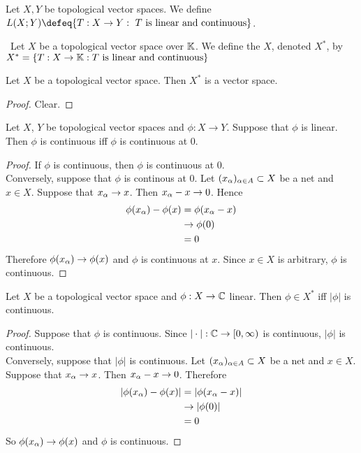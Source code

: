 \documentclass{book}
\begin{document}
	\begin{defn}
		Let $X,Y$ be topological vector spaces. We define $L(X;Y) \defeq \{T:X \rightarrow Y: \text{ $T$ is linear and continuous}\}$.
	\end{defn}
	
	\begin{defn} \
		Let $X$ be a topological vector space over $\mathbb{K}$. We define the  $X$, denoted $X^*$, by $X^* = \{ T : X \rightarrow \mathbb{K}: T \text{ is linear and continuous} \} $
	\end{defn}
	

	\begin{ex}
		Let $X$ be a topological vector space. Then $X^*$ is a vector space. 
	\end{ex}

	\begin{proof}
		Clear.
	\end{proof}

	\begin{ex}
		Let $X$, $Y$ be topological vector spaces and $\phi:X \rightarrow Y$. Suppose that $\phi$ is linear. Then $\phi$ is continuous iff $\phi$ is continuous at $0$.
	\end{ex}
	
	\begin{proof}
		If $\phi$ is continuous, then $\phi$ is continuous at $0$.\\
		Conversely, suppose that $\phi$ is continous at $0$. Let $(x_{\alpha})_{\alpha \in A} \subset X$ be a net and $x \in X$. Suppose that $x_{\alpha} \rightarrow x$. Then $x_{\alpha} - x \rightarrow 0$. Hence 
		\begin{align*}
			\phi(x_{\alpha}) - \phi(x) 
			&= \phi(x_{\alpha} - x) \\
			&\rightarrow \phi(0) \\
			&= 0
		\end{align*}
		Therefore $\phi(x_{\alpha}) \rightarrow \phi(x)$ and $\phi$ is continuous at $x$. Since $x \in X$ is arbitrary, $\phi$ is continuous. 
	\end{proof}

\begin{ex}
	Let $X$ be a topological vector space and $\phi :X \rightarrow \mathbb{C}$ linear. Then $\phi \in X^*$ iff $|\phi|$ is continuous. 
\end{ex}

\begin{proof}
	Suppose that $\phi$ is continuous. Since  $|\cdot|:\mathbb{C} \rightarrow [0,\infty)$ is continuous, $|\phi|$ is continuous. \\
	Conversely, suppose that $|\phi|$ is continuous. Let $(x_{\alpha})_{\alpha \in A} \subset X$ be a net and $x \in X$. Suppose that $x_{\alpha} \rightarrow x$. Then $x_{\alpha} - x \rightarrow 0$. Therefore 
	\begin{align*}
		|\phi(x_{\alpha}) - \phi(x)| 
		&= |\phi(x_{\alpha} - x)| \\
		& \rightarrow |\phi(0)| \\
		&= 0
	\end{align*} 
	So $\phi(x_{\alpha}) \rightarrow \phi(x)$ and $\phi$ is continuous.
\end{proof}
\end{document}
